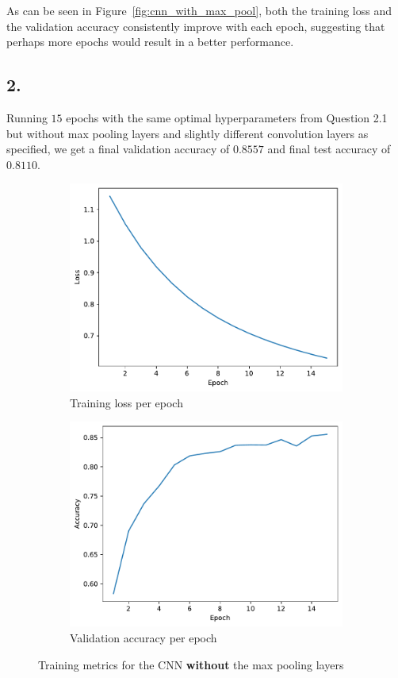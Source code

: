 \documentclass[11pt]{article}
\begin{document}
As can be seen in Figure~\ref{fig:cnn_with_max_pool}, both the training loss and the validation accuracy consistently improve with each epoch, suggesting that perhaps more epochs would result in a better performance.
\subsection{2.}
Running $15$ epochs with the same optimal hyperparameters from Question 2.1 but without max pooling layers and slightly different convolution layers as specified, we get a final validation accuracy of $0.8557$ and final test accuracy of $0.8110$.

\begin{figure}[H]
  \centering
  \begin{subfigure}{.5\textwidth}
    \centering \includegraphics[width=.9\linewidth]{plots/CNN-training-loss-0.01-0.7-0-sgd-True}
  \caption{Training loss per epoch}
\end{subfigure}%
\begin{subfigure}{.5\textwidth}
  \centering
  \includegraphics[width=.9\linewidth]{plots/CNN-validation-accuracy-0.01-0.7-0-sgd-True}
  \caption{Validation accuracy per epoch}
\end{subfigure}
\caption{Training metrics for the CNN \textbf{without} the max pooling layers}
\label{fig:cnn_without_max_pool}
\end{figure}
\end{document}
